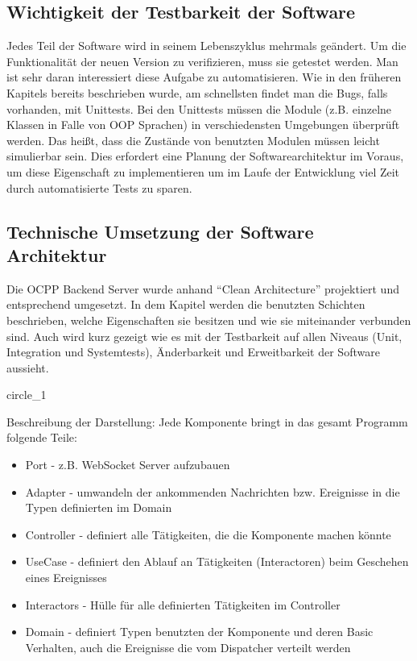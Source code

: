 \documentclass{article}
\begin{document}
    \subsection{Wichtigkeit der Testbarkeit der Software}
    Jedes Teil der Software wird in seinem Lebenszyklus mehrmals geändert. 
    Um die Funktionalität der neuen Version zu verifizieren, muss sie getestet werden.
    Man ist sehr daran interessiert diese Aufgabe zu automatisieren. 
    Wie in den früheren Kapitels bereits beschrieben wurde, am schnellsten findet man die Bugs, falls vorhanden, mit Unittests. 
    Bei den Unittests müssen die Module (z.B. einzelne Klassen in Falle von OOP Sprachen) in verschiedensten Umgebungen überprüft werden. 
    Das heißt, dass die Zustände von benutzten Modulen müssen leicht simulierbar sein.
    Dies erfordert eine Planung der Softwarearchitektur im Voraus, 
    um diese Eigenschaft zu implementieren um im Laufe der Entwicklung viel Zeit durch automatisierte Tests zu sparen.

    \newpage
    \subsection{Technische Umsetzung der Software Architektur}

    Die OCPP Backend Server wurde anhand ``Clean Architecture'' projektiert und entsprechend umgesetzt. 
    In dem Kapitel werden die benutzten Schichten beschrieben, welche Eigenschaften sie besitzen und wie sie miteinander verbunden sind.
    Auch wird kurz gezeigt wie es mit der Testbarkeit auf allen Niveaus (Unit, Integration und Systemtests), Änderbarkeit und Erweitbarkeit der Software aussieht.

    {circle_1}

    Beschreibung der Darstellung:
    Jede Komponente bringt in das gesamt Programm folgende Teile:
    \begin{itemize}
        \item Port - z.B. WebSocket Server aufzubauen
        \item Adapter  - umwandeln der ankommenden Nachrichten bzw. Ereignisse in die Typen definierten im Domain
        \item Controller - definiert alle Tätigkeiten, die die Komponente machen könnte
        \item UseCase - definiert den Ablauf an Tätigkeiten (Interactoren) beim Geschehen eines Ereignisses
        \item Interactors - Hülle für alle definierten Tätigkeiten im Controller
        \item Domain - definiert Typen benutzten der Komponente und deren Basic Verhalten, auch die Ereignisse die vom Dispatcher verteilt werden
    \end{itemize}
\end{document}
